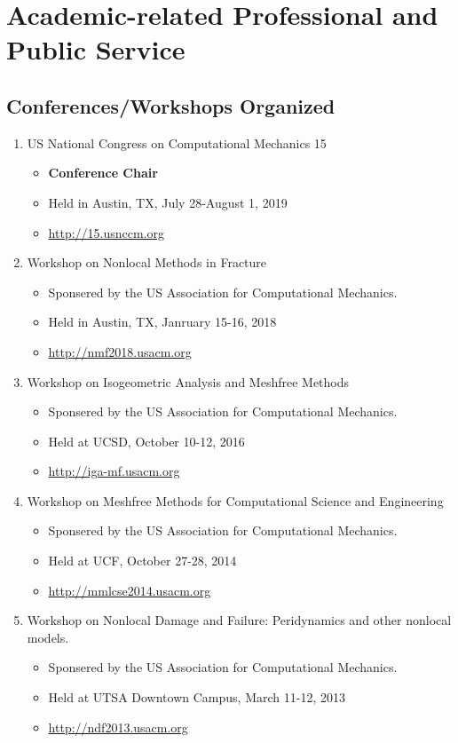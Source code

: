 \section*{Academic-related Professional and Public Service}

\subsection*{Conferences/Workshops Organized}
  \begin{enumerate}
      \item US National Congress on Computational Mechanics 15
          \begin{itemize}
             \item {\bf Conference Chair}
             \item Held in Austin, TX, July 28-August 1, 2019
             \item \url{http://15.usnccm.org}
          \end{itemize}
      \item Workshop on Nonlocal Methods in Fracture
          \begin{itemize}
             \item Sponsered by the US Association for Computational Mechanics.
             \item Held in Austin, TX, Janruary 15-16, 2018
             \item \url{http://nmf2018.usacm.org}
          \end{itemize}
      \item Workshop on Isogeometric Analysis and Meshfree Methods
          \begin{itemize}
             \item Sponsered by the US Association for Computational Mechanics.
             \item Held at UCSD, October 10-12, 2016
             \item \url{http://iga-mf.usacm.org}
          \end{itemize}
      \item Workshop on Meshfree Methods for Computational Science and Engineering
          \begin{itemize}
             \item Sponsered by the US Association for Computational Mechanics.
             \item Held at UCF, October 27-28, 2014
             \item \url{http://mmlcse2014.usacm.org}
          \end{itemize}
      \item Workshop on Nonlocal Damage and Failure: Peridynamics and other nonlocal models.  
          \begin{itemize}
             \item Sponsered by the US Association for Computational Mechanics.
             \item Held at UTSA Downtown Campus, March 11-12, 2013
             \item \url{http://ndf2013.usacm.org}
          \end{itemize}
  \end{enumerate}

